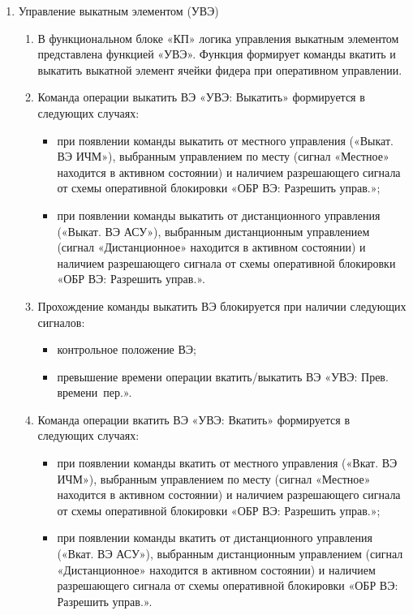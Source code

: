 \begin{enumerate}
\begin{enumerate}
\end{enumerate}


\item Управление выкатным элементом (УВЭ)

\begin{enumerate}

\item 
В функциональном блоке «КП» логика управления выкатным элементом представлена функцией «УВЭ». Функция формирует команды вкатить и выкатить выкатной элемент ячейки фидера при оперативном управлении.

\item
Команда операции выкатить ВЭ «УВЭ: Выкатить» формируется в следующих случаях:
\begin{itemize}
	\item при появлении команды выкатить от местного управления («Выкат. ВЭ ИЧМ»), выбранным управлением по месту (сигнал «Местное» находится в активном состоянии) и наличием разрешающего сигнала от схемы оперативной блокировки «ОБР ВЭ: Разрешить управ.»;
	\item при появлении команды выкатить от дистанционного управления («Выкат. ВЭ АСУ»), выбранным дистанционным управлением (сигнал «Дистанционное» находится в активном состоянии) и наличием разрешающего сигнала от схемы оперативной блокировки «ОБР ВЭ: Разрешить управ.».
\end{itemize}

\item
Прохождение команды выкатить ВЭ блокируется при наличии следующих сигналов:
\begin{itemize}
	\item контрольное положение ВЭ;
	\item превышение времени операции вкатить/выкатить ВЭ «УВЭ: Прев. времени~пер.».
\end{itemize}

\item
Команда операции вкатить ВЭ «УВЭ: Вкатить» формируется в следующих случаях:
\begin{itemize}
	\item при появлении команды вкатить от местного управления («Вкат. ВЭ ИЧМ»), выбранным управлением по месту (сигнал «Местное» находится в активном состоянии) и наличием разрешающего сигнала от схемы оперативной блокировки «ОБР ВЭ: Разрешить управ.»;
	\item при появлении команды вкатить от дистанционного управления («Вкат. ВЭ АСУ»), выбранным дистанционным управлением (сигнал «Дистанционное» находится в активном состоянии) и наличием разрешающего сигнала от схемы оперативной блокировки «ОБР ВЭ: Разрешить управ.».
\end{itemize}


\end{enumerate}
\end{enumerate}
